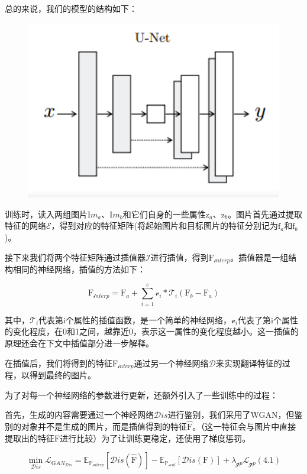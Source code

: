 \documentclass[UTF8,a4paper，12pt]{article}
\def\MC {\mathcal}
\theoremstyle{theorem}
\theoremstyle{definition}
\begin{document}
总的来说，我们的模型的结构如下：

\begin{figure}[htbp]
	\centering
	\includegraphics[width=1.0\textwidth]{assets/10}
	\caption{}
\end{figure}

训练时，读入两组图片$\mathrm Im_a$、$\mathrm Im_b$和它们自身的一些属性$\mathrm z_a$、$\mathrm z_b$。图片首先通过提取特征的网络$\MC E$，得到对应的特征矩阵(将起始图片和目标图片的特征分别记为$\mathrm f_a$和$\mathrm f_b$)。

接下来我们将两个特征矩阵通过插值器$\MC I$进行插值，得到$\mathrm F_{\MC interp}$。插值器是一组结构相同的神经网络，插值的方法如下：

$$\mathrm F_{\MC interp} = \mathrm F_a + \sum_{i=1}^{c}{\MC v_i * \MC T_i(\mathrm F_b - \mathrm F_a)}$$

其中，$\MC T_i$代表第$\mathrm i$个属性的插值函数，是一个简单的神经网络，$\MC v_i$代表了第$\mathrm i$个属性的变化程度，在0和1之间，越靠近0，表示这一属性的变化程度越小。这一插值的原理还会在下文中插值部分进一步解释。

在插值后，我们将得到的特征$\mathrm F_{\MC interp}$通过另一个神经网络$\MC D$来实现翻译特征的过程，以得到最终的图片。

为了对每一个神经网络的参数进行更新，还额外引入了一些训练中的过程：

首先，生成的内容需要通过一个神经网络$\MC Dis$进行鉴别，我们采用了WGAN，但鉴别的对象并不是生成的图片，而是插值得到的特征$\hat{\mathrm F}$。（这一特征会与图片中直接提取出的特征$\mathrm F$进行比较）为了让训练更稳定，还使用了梯度惩罚。

$$\min_{\MC Dis} \MC L_{\mathrm GAN_{\MC Dis}} = \mathbb E_{\mathbb P_{\MC interp}}[\MC Dis(\hat{\mathrm F})] - \mathbb E_{\mathbb P_{\MC real}}[\MC Dis(\mathrm F)] + \lambda_{\MC gp}\MC L_{\MC gp}    (4.1)$$
\end{document}
